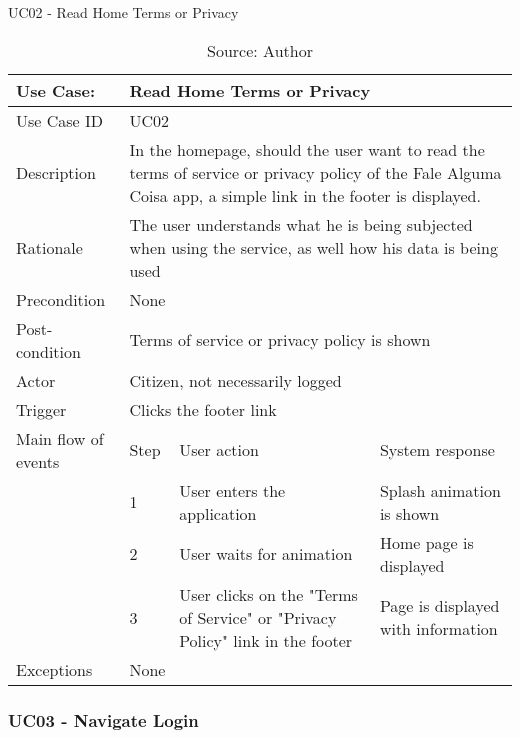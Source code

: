 \begin{table}[h]
\centering
\caption{UC02 - Read Home Terms or Privacy}
\label{uc:02}
\begin{tabular}{|p{3cm}|p{1cm}|p{5cm}|p{5cm}|}
\hline
Use Case:       & \multicolumn{3}{p{11cm}|}{Read Home Terms or Privacy} \\ \hline
Use Case ID     & \multicolumn{3}{p{11cm}|}{UC02} \\ \hline
Description     & \multicolumn{3}{p{11cm}|}{In the homepage, should the user want to read the terms of service or privacy policy of the Fale Alguma Coisa app, a simple link in the footer is displayed.} \\ \hline
Rationale       & \multicolumn{3}{p{11cm}|}{The user understands what he is being subjected when using the service, as well how his data is being used} \\ \hline
Precondition    & \multicolumn{3}{p{11cm}|}{None} \\ \hline
Post-condition  & \multicolumn{3}{p{11cm}|}{Terms of service or privacy policy is shown} \\ \hline
Actor           & \multicolumn{3}{p{11cm}|}{Citizen, not necessarily logged} \\ \hline
Trigger         & \multicolumn{3}{p{11cm}|}{Clicks the footer link} \\ \hline
Main flow of events & Step  & User action & System response \\ \hline
                    & 1     & User enters the application & Splash animation is shown \\ \hline
                    & 2     & User waits for animation & Home page is displayed \\ \hline
                    & 3     & User clicks on the "Terms of Service" or "Privacy Policy" link in the footer & Page is displayed with information\\ \hline
Exceptions      & \multicolumn{3}{p{11cm}|}{None} \\ \hline
\end{tabular}
\caption*{Source: Author}
\end{table}


\subsubsection{UC03 - Navigate Login}

